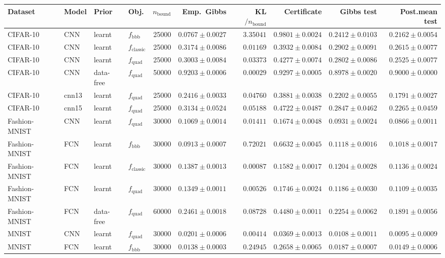 \begin{tabular}{llll r r r r r r}
\toprule
Dataset & Model & Prior & Obj. & $n_{\text{bound}}$ & Emp.\ Gibbs & KL$/n_{\text{bound}}$ & \textbf{Certificate} & Gibbs test & Post.mean test \\
\midrule
CIFAR-10 & CNN & learnt & $f_{\text{bbb}}$ & 25000 & $0.0767\pm0.0027$ & $3.35041$ & $0.9801\pm0.0024$ & $0.2412\pm0.0103$ & $0.2162\pm0.0054$ \\
CIFAR-10 & CNN & learnt & $f_{\text{classic}}$ & 25000 & $0.3174\pm0.0086$ & $0.01169$ & $0.3932\pm0.0084$ & $0.2902\pm0.0091$ & $0.2615\pm0.0077$ \\
CIFAR-10 & CNN & learnt & $f_{\text{quad}}$ & 25000 & $0.3003\pm0.0084$ & $0.03373$ & $0.4277\pm0.0074$ & $0.2802\pm0.0086$ & $0.2525\pm0.0077$ \\
CIFAR-10 & CNN & data-free & $f_{\text{quad}}$ & 50000 & $0.9203\pm0.0006$ & $0.00029$ & $0.9297\pm0.0005$ & $0.8978\pm0.0020$ & $0.9000\pm0.0000$ \\
CIFAR-10 & cnn13 & learnt & $f_{\text{quad}}$ & 25000 & $0.2416\pm0.0033$ & $0.04760$ & $0.3881\pm0.0038$ & $0.2202\pm0.0055$ & $0.1791\pm0.0027$ \\
CIFAR-10 & cnn15 & learnt & $f_{\text{quad}}$ & 25000 & $0.3134\pm0.0524$ & $0.05188$ & $0.4722\pm0.0487$ & $0.2847\pm0.0462$ & $0.2265\pm0.0459$ \\
Fashion-MNIST & CNN & learnt & $f_{\text{quad}}$ & 30000 & $0.1069\pm0.0014$ & $0.01411$ & $0.1674\pm0.0048$ & $0.0931\pm0.0024$ & $0.0866\pm0.0011$ \\
Fashion-MNIST & FCN & learnt & $f_{\text{bbb}}$ & 30000 & $0.0913\pm0.0007$ & $0.72021$ & $0.6632\pm0.0045$ & $0.1118\pm0.0016$ & $0.1018\pm0.0017$ \\
Fashion-MNIST & FCN & learnt & $f_{\text{classic}}$ & 30000 & $0.1387\pm0.0013$ & $0.00087$ & $0.1582\pm0.0017$ & $0.1204\pm0.0028$ & $0.1136\pm0.0024$ \\
Fashion-MNIST & FCN & learnt & $f_{\text{quad}}$ & 30000 & $0.1349\pm0.0011$ & $0.00526$ & $0.1746\pm0.0024$ & $0.1186\pm0.0030$ & $0.1109\pm0.0035$ \\
Fashion-MNIST & FCN & data-free & $f_{\text{quad}}$ & 60000 & $0.2461\pm0.0018$ & $0.08728$ & $0.4480\pm0.0011$ & $0.2254\pm0.0062$ & $0.1891\pm0.0056$ \\
MNIST & CNN & learnt & $f_{\text{quad}}$ & 30000 & $0.0201\pm0.0006$ & $0.00414$ & $0.0369\pm0.0013$ & $0.0108\pm0.0011$ & $0.0095\pm0.0009$ \\
MNIST & FCN & learnt & $f_{\text{bbb}}$ & 30000 & $0.0138\pm0.0003$ & $0.24945$ & $0.2658\pm0.0065$ & $0.0187\pm0.0007$ & $0.0149\pm0.0006$ \\

\end{tabular}
